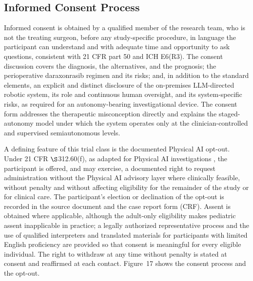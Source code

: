 \subsection{Informed Consent Process}

Informed consent is obtained by a qualified member of the research team, who is
not the treating surgeon, before any study-specific procedure, in language the
participant can understand and with adequate time and opportunity to ask
questions, consistent with 21 CFR part 50 \cite{ecfr2026part50} and ICH E6(R3).
The consent discussion covers the diagnosis, the alternatives, and the prognosis;
the perioperative daraxonrasib regimen and its risks; and, in addition to the
standard elements, an explicit and distinct disclosure of the on-premises
LLM-directed robotic system, its role and continuous human oversight, and its
system-specific risks, as required for an autonomy-bearing investigational device.
The consent form addresses the therapeutic misconception directly and explains the
staged-autonomy model under which the system operates only at the
clinician-controlled and supervised semiautonomous levels.

A defining feature of this trial class is the documented Physical AI opt-out.
Under 21 CFR $\S$312.60(f), as adapted for Physical AI investigations
\cite{kawchak2026adapt312}, the participant is offered, and may exercise, a
documented right to request administration without the Physical AI advisory layer
where clinically feasible, without penalty and without affecting eligibility for
the remainder of the study or for clinical care. The participant's election or
declination of the opt-out is recorded in the source document and the case report
form (CRF). Assent is obtained where applicable, although the adult-only
eligibility makes pediatric assent inapplicable in practice; a legally authorized
representative process and the use of qualified interpreters and translated
materials for participants with limited English proficiency are provided so that
consent is meaningful for every eligible individual. The right to withdraw at any
time without penalty is stated at consent and reaffirmed at each contact.
Figure~17 shows the consent process and the opt-out.

